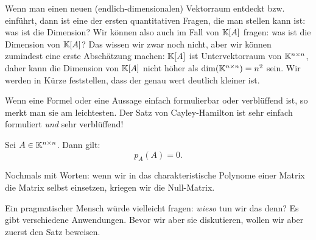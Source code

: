 \begin{bem}
	Wenn man einen neuen (endlich-dimensionalen) Vektorraum entdeckt bzw. einführt, dann ist eine der ersten quantitativen Fragen, die man stellen kann ist: was ist die Dimension? Wir können also auch im Fall von $\mathbb K[A]$ fragen: 
	was ist die Dimension von $\mathbb K[A]$? Das wissen wir zwar noch nicht, aber wir können zumindest eine erste Abschätzung machen: $\mathbb K[A]$ ist Untervektorraum von $\mathbb K^{n \times n}$, daher kann die Dimension von $\mathbb K[A]$ nicht höher als $\dim( \mathbb K^{n \times n}) = n^2$ sein. Wir werden in Kürze feststellen, dass der genau wert deutlich kleiner ist. 
\end{bem} 

Wenn eine Formel oder eine Aussage einfach formulierbar oder verblüffend ist, so merkt man sie am leichtesten. Der Satz von Cayley-Hamilton ist sehr einfach formuliert \emph{und} sehr verblüffend!

\begin{thm}
	Sei $ A \in \mathbb K^{n \times n} $. Dann gilt:
	\begin{equation}
		p_A(A) = 0.
	\end{equation}
\end{thm}

Nochmals mit Worten: wenn wir in das charakteristische Polynome einer Matrix die Matrix selbst einsetzen, kriegen wir die Null-Matrix. 

Ein pragmatischer Mensch würde vielleicht fragen: \emph{wieso} tun wir das denn? Es gibt verschiedene Anwendungen. Bevor wir aber sie diskutieren, wollen wir aber zuerst den Satz beweisen. 

